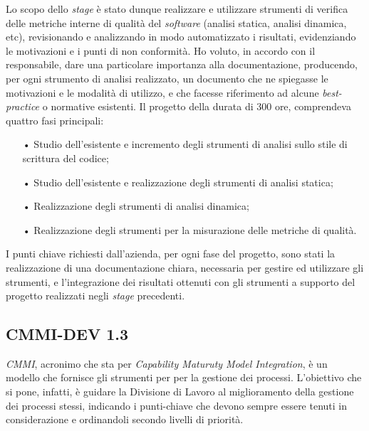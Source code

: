 Lo scopo dello \textit{stage} è stato dunque realizzare e utilizzare strumenti di verifica delle metriche interne di qualità del 
\textit{software} (analisi statica, analisi dinamica, etc), revisionando e analizzando in modo automatizzato i risultati, evidenziando le motivazioni e i punti di non conformità. Ho voluto, in accordo con il responsabile, dare una particolare importanza alla documentazione, producendo, per ogni strumento di analisi realizzato, un documento che ne spiegasse le motivazioni e le modalità di utilizzo, e che facesse riferimento ad alcune \textit{best-practice} o normative esistenti. Il progetto della durata di 300 ore, comprendeva quattro fasi principali:
\begin{itemize}
\item[•] Studio dell'esistente e incremento degli strumenti di analisi sullo stile di scrittura del codice;
\item[•] Studio dell'esistente e realizzazione degli strumenti di analisi statica;
\item[•] Realizzazione degli strumenti di analisi dinamica;
\item[•] Realizzazione degli strumenti per la misurazione delle metriche di qualità.
\end{itemize}

I punti chiave richiesti dall'azienda, per ogni fase del progetto, sono stati la realizzazione di una documentazione chiara, necessaria per gestire ed utilizzare gli strumenti, e l'integrazione dei risultati ottenuti con gli strumenti a supporto del progetto realizzati negli \textit{stage} precedenti.


\subsection{CMMI-DEV 1.3}
\textit{CMMI}, acronimo che sta per \textit{Capability Maturuty Model Integration}, è un modello che fornisce gli strumenti per  per la gestione dei processi. L'obiettivo che si pone, infatti, è guidare la Divisione di Lavoro al miglioramento della gestione dei processi stessi, indicando i punti-chiave che devono sempre essere tenuti in considerazione e ordinandoli secondo livelli di priorità.

